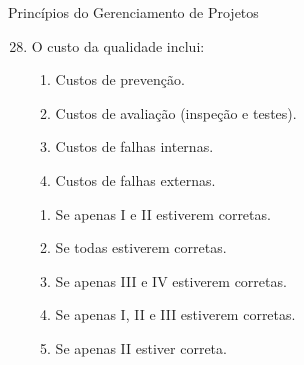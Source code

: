 \documentclass{beamer}
\begin{document}
\begin{frame}{Princípios do Gerenciamento de Projetos}
	\begin{enumerate}
		\setcounter{enumi}{27}
		\justifying
		\item O custo da qualidade inclui:
		\begin{enumerate}[I]
			\item Custos de prevenção.
			\item Custos de avaliação (inspeção e testes).
			\item Custos de falhas internas.
			\item Custos de falhas externas.
		\end{enumerate}
		\begin{enumerate}[a]
			\item Se apenas I e II estiverem corretas.
			\item \alert<2>{Se todas estiverem corretas.}
			\item Se apenas III e IV estiverem corretas.
			\item Se apenas I, II e III estiverem corretas.
			\item Se apenas II estiver correta.
		\end{enumerate}
	\end{enumerate}
\end{frame}
\end{document}
